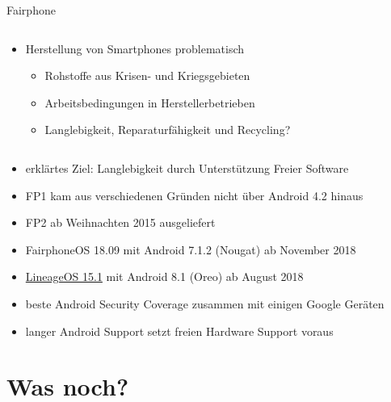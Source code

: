 \documentclass[t]{beamer}
\begin{document}
\begin{frame}{Fairphone}
    \begin{columns}[T]
        \begin{column}{0.77\textwidth}
            \begin{itemize}
                \item Herstellung von Smartphones problematisch
                    \begin{itemize}
                        \item Rohstoffe aus Krisen- und Kriegsgebieten
                        \item Arbeitsbedingungen in Herstellerbetrieben
                        \item Langlebigkeit, Reparaturfähigkeit und
                            Recycling?
                    \end{itemize}
            \end{itemize}
        \end{column}
        \begin{column}{0.2\textwidth}
        \end{column}
    \end{columns}
    \begin{itemize}
        \item erklärtes Ziel: Langlebigkeit durch Unterstützung Freier
            Software
        \item FP1 kam aus verschiedenen Gründen nicht über Android 4.2
            hinaus
        \item FP2 ab Weihnachten 2015 ausgeliefert
        \item FairphoneOS 18.09 mit Android 7.1.2 (Nougat) ab November
            2018
        \item \href{https://wiki.lineageos.org/devices/FP2}{LineageOS 15.1}
            mit Android 8.1 (Oreo) ab August 2018
        \item beste Android Security Coverage zusammen mit einigen
            Google Geräten
        \item langer Android Support setzt freien Hardware Support
            voraus
    \end{itemize}
\end{frame}

\section*{Was noch?}
\end{document}
